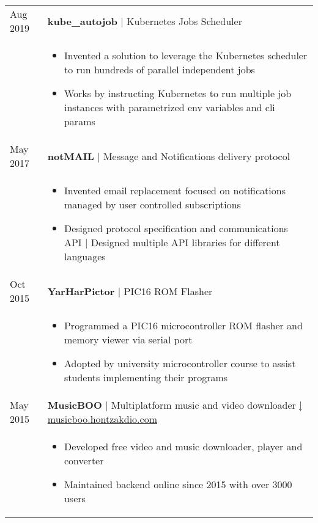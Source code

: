 \documentclass[a4paper,10pt]{article}
\begin{document}
\begin{tabular}{p{1.5cm}p{14.8cm}}
 Aug 2019 & \textbf{kube\_autojob} | Kubernetes Jobs Scheduler \\
 & \footnotesize{ \begin{itemize}[noitemsep,topsep=3pt]
 \vspace{-0.1in}
 \item Invented a solution to leverage the Kubernetes scheduler to run hundreds of parallel independent jobs
 \item Works by instructing Kubernetes to run multiple job instances with parametrized env variables and cli params
 \end{itemize}} \vspace{-0.1in} \\ 

 May 2017 & \textbf{notMAIL} | Message and Notifications delivery protocol \\
 & \footnotesize{ \begin{itemize}[noitemsep,topsep=3pt]
 \vspace{-0.1in}
 \item Invented email replacement focused on notifications managed by user controlled subscriptions
 \item Designed protocol specification and communications API | Designed multiple API libraries for different languages
 \end{itemize}} \vspace{-0.1in} \\ 

 Oct 2015 & \textbf{YarHarPictor} | PIC16 ROM Flasher \\
 & \footnotesize{ \begin{itemize}[noitemsep,topsep=3pt]
 \vspace{-0.1in}
 \item Programmed a PIC16 microcontroller ROM flasher and memory viewer via serial port
 \item Adopted by university microcontroller course to assist students implementing their programs
 \end{itemize}} \vspace{-0.1in} \\ 

 May 2015 & \textbf{MusicBOO} | Multiplatform music and video downloader \href{http://musicboo.hontzakdio.com/}{\hfill | \footnotesize musicboo.hontzakdio.com}\\
 & \footnotesize{ \begin{itemize}[noitemsep,topsep=3pt]
 \vspace{-0.1in}
 \item Developed free video and music downloader, player and converter
 \item Maintained backend online since 2015 with over 3000 users
 \end{itemize}} \vspace{-0.1in} \\ 


\end{tabular}
\end{document}
